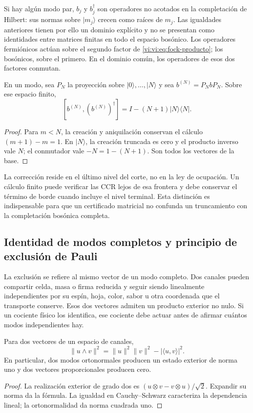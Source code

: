 Si hay algún modo par, \(b_j\) y \(b_j^\dagger\) son operadores
no acotados en la completación de Hilbert: sus normas sobre
\(|m_j\rangle\) crecen como raíces de \(m_j\). Las igualdades
anteriores tienen por ello un dominio explícito y no se presentan
como identidades entre matrices finitas en todo el espacio bosónico.
Los operadores fermiónicos actúan sobre el segundo factor de
\eqref{vi:vi:eq:fock-producto}; los bosónicos, sobre el primero. En
el dominio común, los operadores de esos dos factores conmutan.

\begin{proposition}
\label{vi:vi:prop:corte-bosonico}
En un modo, sea \(P_N\) la proyección sobre
\(|0\rangle,\ldots,|N\rangle\) y sea \(b^{(N)}=P_NbP_N\).
Sobre ese espacio finito,
\[
 [b^{(N)},(b^{(N)})^\dagger]
 =I-(N+1)|N\rangle\langle N|.
\]
\end{proposition}
\begin{proof}
Para \(m<N\), la creación y aniquilación conservan el cálculo
\((m+1)-m=1\). En \(|N\rangle\), la creación truncada es
cero y el producto inverso vale \(N\); el conmutador vale
\(-N=1-(N+1)\). Son todos los vectores de la base.
\end{proof}

La corrección reside en el último nivel del corte, no en la ley de
ocupación. Un cálculo finito puede verificar las CCR lejos de esa
frontera y debe conservar el término de borde cuando incluye el
nivel terminal. Esta distinción es indispensable para que un
certificado matricial no confunda un truncamiento con la
completación bosónica completa.

\subsection{Identidad de modos completos y principio de exclusión de Pauli}
\label{vi:vi:subsec:pauli-etiquetas-hojas}

La exclusión se refiere al mismo vector de un modo completo. Dos
canales pueden compartir celda, masa o firma reducida y seguir
siendo linealmente independientes por su espín, hoja, color,
sabor u otra coordenada que el transporte conserve. Esos dos
vectores admiten un producto exterior no nulo. Si un cociente
físico los identifica, ese cociente debe actuar antes de afirmar
cuántos modos independientes hay.

\begin{proposition}
\label{vi:vi:prop:pauli-gram}
Para dos vectores de un espacio de canales,
\[
 \|u\wedge v\|^2
 =\|u\|^2\|v\|^2-|\langle u,v\rangle|^2.
\]
En particular, dos modos ortonormales producen un estado exterior
de norma uno y dos vectores proporcionales producen cero.
\end{proposition}
\begin{proof}
La realización exterior de grado dos es
\((u\otimes v-v\otimes u)/\sqrt2\). Expandir su norma da
la fórmula. La igualdad en Cauchy--Schwarz caracteriza la
dependencia lineal; la ortonormalidad da norma cuadrada uno.
\end{proof}

